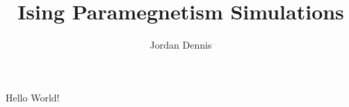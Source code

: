 \documentclass[a4paper]{article}
\author{Jordan Dennis}
\title{Ising Paramegnetism Simulations}
\begin{document}
Hello World!
\end{document}
